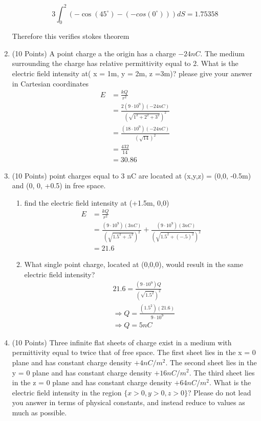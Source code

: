 \documentclass{article}
\begin{document}
\begin{enumerate}
    \begin{equation}
        3\int_0^2 (-\cos(45^\circ)-(-cos(0^\circ)))dS = \boxed{1.75358}
    \end{equation}
    \begin{center}
        Therefore this verifies stokes theorem
    \end{center}
    \newpage
    \item (10 Points) A point charge a the origin has a charge $-24nC.$ The medium surrounding the charge has relative permittivity equal to 2. What is the electric field intensity at( x = 1m, y = 2m, z =3m)? please give your answer in Cartesian coordinates
    \begin{align}
        E &= \frac{kQ}{r^2}\\
        &= \frac{2(9\cdot10^9)(-24nC)}{(\sqrt{1^2 + 2^2+ 3^2})^2}\\
        &= \frac{(18\cdot10^9)(-24nC)}{(\sqrt{14})^2}\\
        &= \frac{432}{14}\\
        &= \boxed{30.86}
    \end{align}
    \newpage
    \item (10 Points) point charges equal to 3 nC are located at (x,y,z) = (0,0, -0.5m) and (0, 0, +0.5) in free space.
    \begin{enumerate}
        \item  find the electric field intensity at (+1.5m, 0,0)
        \begin{align}
            E &= \frac{kQ}{r^2}\\
            &= \frac{(9\cdot10^9)(3nC)}{(\sqrt{1.5^2+.5^2})^2} + \frac{(9\cdot10^9)(3nC)}{(\sqrt{1.5^2+(-.5)^2})^2}\\
            &= \boxed{21.6}
        \end{align}
        \item What single point charge, located at (0,0,0), would result in the same electric field intensity?
        \begin{align}
            &21.6 = \frac{(9\cdot10^9)Q}{(\sqrt{1.5^2})^2}\\
            &\Rightarrow Q = \frac{(1.5^2)(21.6)}{9\cdot10^9}\\
            &\Rightarrow Q = \boxed{5nC}
        \end{align}
    \end{enumerate}
    \newpage
    \item (10 Points) Three infinite flat sheets of charge exist in a medium with permittivity equal to twice that of free space. The first sheet lies in the x = 0 plane and has constant charge density $+4nC/m^2$. The second sheet lies in the y = 0 plane and has constant charge density $+16nC/m^2$. The third sheet lies in the z = 0 plane and has constant charge density $+64nC/m^2$. What is the electric field intensity in the region $\{x > 0, y > 0, z > 0\}$? Please do not lead you answer in terms of physical constants, and instead reduce to values as much as possible.

\end{enumerate}
\end{document}
